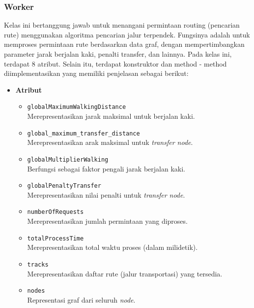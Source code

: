 \subsubsection{Worker}
\label{subss:worker}
Kelas ini bertanggung jawab untuk menangani permintaan routing (pencarian rute) menggunakan algoritma pencarian jalur terpendek. Fungsinya adalah untuk memproses permintaan rute berdasarkan data graf, dengan mempertimbangkan parameter jarak berjalan kaki, penalti transfer, dan lainnya. Pada kelas ini, terdapat 8 atribut. Selain itu, terdapat konstruktor dan method - method diimplementasikan yang memiliki penjelasan sebagai berikut:
\begin{itemize}
    \item \textbf{Atribut}
    \begin{itemize}
        \item \texttt{globalMaximumWalkingDistance}
        \\ Merepresentasikan jarak maksimal untuk berjalan kaki.
        \item \texttt{global\_maximum\_transfer\_distance}
        \\ Merepresentasikan arak maksimal untuk \textit{transfer node}.
        \item \texttt{globalMultiplierWalking}
        \\ Berfungsi sebagai faktor pengali jarak berjalan kaki.
        \item \texttt{globalPenaltyTransfer}
        \\ Merepresentasikan nilai penalti untuk \textit{transfer node}.
        \item \texttt{numberOfRequests}
        \\ Merepresentasikan jumlah permintaan yang diproses.
        \item \texttt{totalProcessTime}
        \\ Merepresentasikan total waktu proses (dalam milidetik).
        \item \texttt{tracks}
        \\ Merepresentasikan daftar rute (jalur transportasi) yang tersedia.
        \item \texttt{nodes}
        \\ Representasi graf dari seluruh \textit{node}.
    \end{itemize}


\end{itemize}
